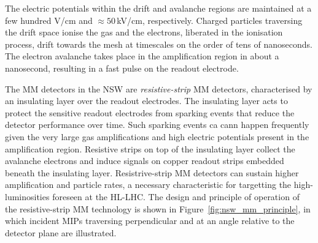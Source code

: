 The electric potentials within the drift and avalanche regions are maintained
at a few hundred V/cm and $\approx50$\,kV/cm, respectively.
Charged particles traversing the drift space ionise the gas and the electrons, liberated
in the ionisation process, drift towards the mesh at timescales on the order of tens of nanoseconds.
The electron avalanche takes place in the amplification region in about a nanosecond,
resulting in a fast pulse on the readout electrode.

The MM detectors in the NSW are \textit{resistive-strip} MM detectors, characterised by an insulating
layer over the readout electrodes.
The insulating layer acts to protect the sensitive readout electrodes from sparking events that
reduce the detector performance over time.
Such sparking events ca cann happen frequently given the very large gas amplifications and high electric potentials
present in the amplification region.
Resistive strips on top of the insulating layer collect the avalanche electrons and induce
signals on copper readout strips embedded beneath the insulating layer.
Resistrive-strip MM detectors can sustain higher amplification and particle rates, a necessary
characteristic for targetting the high-luminosities foreseen at the HL-LHC.
The design and principle of operation of the resistive-strip MM technology is shown in Figure~\ref{fig:nsw_mm_principle},
in which incident MIPs traversing perpendicular and at an angle relative to the detector plane
are illustrated.

